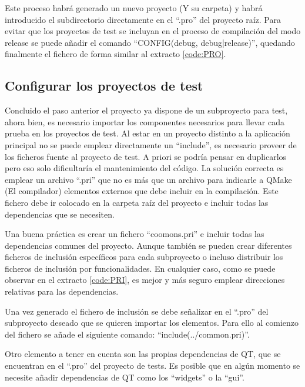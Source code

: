 Este proceso habrá generado un nuevo proyecto (Y su carpeta) y habrá introducido el subdirectorio directamente en el ``.pro'' del proyecto raíz. Para evitar que los proyectos de test se incluyan en el proceso de compilación del modo release se puede añadir el comando ``CONFIG(debug, debug|release)'', quedando finalmente el fichero de forma similar al extracto \ref{code:PRO}.


\subsection{Configurar los proyectos de test}

Concluido el paso anterior el proyecto ya dispone de un subproyecto para test, ahora bien, es necesario importar los componentes necesarios para llevar cada prueba en los proyectos de test. Al estar en un proyecto distinto a la aplicación principal no se puede emplear directamente un ``include'', es necesario proveer de los ficheros fuente al proyecto de test. A priori se podría pensar en duplicarlos pero eso solo dificultaría el mantenimiento del código.  
La solución correcta es emplear un archivo ``.pri'' que no es más que un archivo para indicarle a QMake (El compilador) elementos externos que debe incluir en la compilación. Este fichero debe ir colocado en la carpeta raíz del proyecto e incluir todas las dependencias que se necesiten.

Una buena práctica es crear un fichero ``coomons.pri'' e incluir todas las dependencias comunes del proyecto. Aunque también se pueden crear diferentes ficheros de inclusión específicos para cada subproyecto o incluso distribuir los ficheros de inclusión por funcionalidades. En cualquier caso, como se puede observar en el extracto \ref{code:PRI}, es mejor y más seguro emplear direcciones relativas para las dependencias.


Una vez generado el fichero de inclusión se debe señalizar en el ``.pro'' del subproyecto deseado que se quieren importar los elementos. Para ello al comienzo del fichero se añade el siguiente comando: ``include(../common.pri)''.

Otro elemento a tener en cuenta son las propias dependencias de QT, que se encuentran en el ``.pro'' del proyecto de tests. Es posible que en algún momento se necesite añadir dependencias de QT como los ``widgets'' o la ``gui''.

